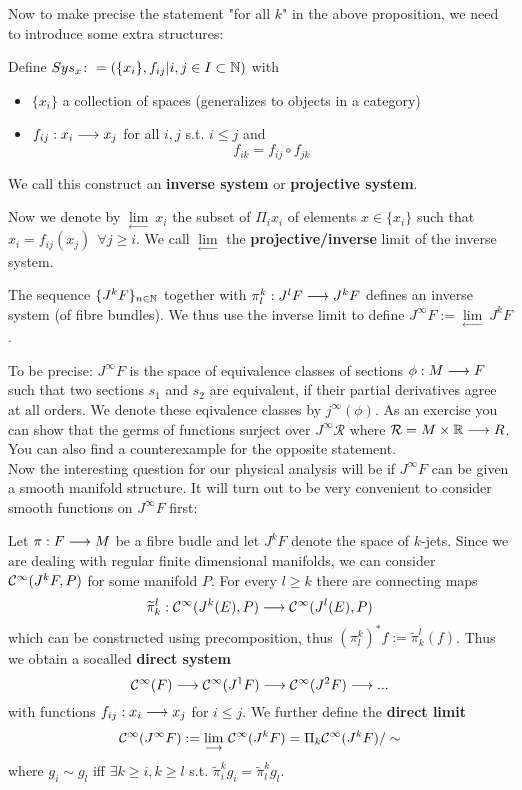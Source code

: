 Now to make precise the statement "for all $k$" in the above proposition, we need to introduce some extra structures:

\begin{definition}
\label{def:inverse_system}
  Define $Sys_x \colon = (\{x_i\}, f_{ij} | i,j \in I \subset \mathbb{N})$ with
  \begin{itemize}
    \item $\{x_i\}$ a collection of spaces (generalizes to objects in a category)
    \item $f_{ij}:x_i \longrightarrow x_j$ for all $i,j$ s.t. $i \leq j$ and
    $$ f_{ik} = f_{ij} \circ f_{jk} $$
  \end{itemize}
  We call this construct an \textbf{inverse system} or \textbf{projective system}.
\end{definition}

Now we denote by $\underset{\longleftarrow}{\lim} \ x_i$ the subset of $\Pi_i x_i$ of elements $x\in \{ x_i\}$ such that $x_i = f_{ij}(x_j) \ \ \forall j \geq i$. We call $\underset{\longleftarrow}{\lim}$ the \textbf{projective/inverse} limit of the inverse system.

\begin{definition}
  The sequence $\{J^k F\}_{n\in\mathbb{N}}$ together with $\pi^k_l: J^l F \longrightarrow J^k F$ defines an inverse system (of fibre bundles). We thus use the inverse limit to define $J^\infty F := \underset{\longleftarrow}{\lim}\ J^k F$.
\end{definition}

To be precise: $J^\infty F$ is the space of equivalence classes of sections $\phi:M \lra F$ such that two sections $s_1$ and $s_2$ are equivalent, if their partial derivatives agree at all orders. We denote these eqivalence classes by $j^\infty(\phi)$. As an exercise you can show that the germs of functions surject over $J^\infty \mathcal{R}$ where $\mathcal{R} = M \times \mathbb{R} \longrightarrow R$. You can also find a counterexample for the opposite statement.\\

Now the interesting question for our physical analysis will be if $J^\infty F$ can be given a smooth manifold structure. It will turn out to be very convenient to consider smooth functions on $J^\infty F$ first:

\begin{definition}
  Let $\pi: F \longrightarrow M$ be a fibre budle and let $J^kF$ denote the space of $k$-jets. Since we are dealing with regular finite dimensional manifolds, we can consider $\mathcal{C}^{\infty}(J^kF, P)$ for some manifold $P$. For every $l\geq k$ there are connecting maps
  $$\widetilde \pi^l_k : \mathcal{C}^{\infty}(J^k(E), P) \longrightarrow \mathcal{C}^{\infty}(J^l(E), P)$$
  which can be constructed using precomposition, thus $(\pi^k_l)^* f := \widetilde \pi^l_k (f)$. Thus we obtain a socalled \textbf{direct system}
  $$ \mathcal{C}^{\infty}(F) \longrightarrow \mathcal{C}^{\infty}(J^1F) \longrightarrow \mathcal{C}^{\infty}(J^2F) \longrightarrow ... $$
  with functions $f_{ij}:x_i \longrightarrow x_j$ for $i\leq j$. We further define the \textbf{direct limit}
  $$\mathcal{C}^{\infty}(J^\infty F) := \underset{\longrightarrow}{\lim}\ \mathcal{C}^{\infty}(J^k F) = \Pi_k \mathcal{C}^{\infty}(J^k F) / \sim$$
  where $g_i \sim g_l$ iff $\exists k \geq i, k \geq l$ s.t. $\widetilde \pi^k_i g_i = \widetilde \pi^k_l g_l$.
\end{definition}


